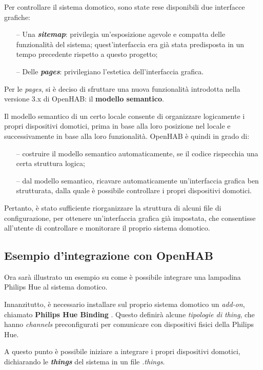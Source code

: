Per controllare il sistema domotico, sono state rese disponibili due interfacce
grafiche:
\begin{itemize}
  \item[--] Una \textit{\textbf{sitemap}}: privilegia un’esposizione agevole e
        compatta delle funzionalità del sistema; quest’interfaccia era già stata
        predisposta in un tempo precedente rispetto a questo progetto;
  \item[--] Delle \textit{\textbf{pages}}: privilegiano l’estetica
        dell’interfaccia grafica.
\end{itemize}
Per le \textit{pages}, si è deciso di sfruttare una nuova funzionalità
introdotta nella versione 3.x di OpenHAB: il \textbf{modello semantico}.

Il modello semantico di un certo locale consente di organizzare logicamente i
propri dispositivi domotici, prima in base alla loro posizione nel locale e
successivamente in base alla loro funzionalità. OpenHAB è quindi in grado di:
\begin{itemize}
  \item[--] costruire il modello semantico automaticamente, se il codice
        rispecchia una certa struttura logica;
  \item[--] dal modello semantico, ricavare automaticamente un’interfaccia
        grafica ben strutturata, dalla quale è possibile controllare i propri
        dispositivi domotici.
\end{itemize}
Pertanto, è stato sufficiente riorganizzare la struttura di alcuni file di
configurazione, per ottenere un’interfaccia grafica già impostata, che
consentisse all’utente di controllare e monitorare il proprio sistema
domotico.

\subsection{Esempio d'integrazione con OpenHAB}
\label{subsec:Sezione5.1.3}

Ora sarà illustrato un esempio su come è possibile integrare una lampadina
Philips Hue al sistema domotico.

Innanzitutto, è necessario installare sul proprio sistema domotico un
\textit{add-on}, chiamato \textbf{Philips Hue Binding} \cite{BINDING_PH}.
Questo definirà alcune \textit{tipologie di thing}, che hanno \textit{channels}
preconfigurati per comunicare con dispositivi fisici della Philips Hue.

A questo punto è possibile iniziare a integrare i propri dispositivi domotici,
dichiarando le \textit{\textbf{things}} del sistema in un file
\textit{.things}.

